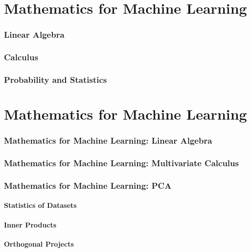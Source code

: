\part{Mathematics for Machine Learning} %


\section{Linear Algebra}


\section{Calculus}


\section{Probability and Statistics}


\part{Mathematics for Machine Learning}


\section{Mathematics for Machine Learning: Linear Algebra}


\section{Mathematics for Machine Learning: Multivariate Calculus}


\section{Mathematics for Machine Learning: PCA}

\subsection{Statistics of Datasets}

\subsection{Inner Products}

\subsection{Orthogonal Projects}

